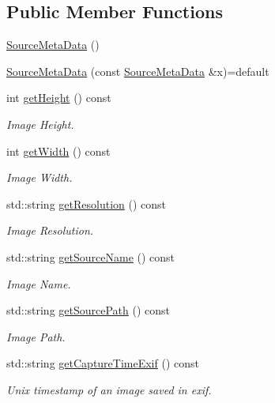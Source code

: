 \subsection*{Public Member Functions}
\begin{DoxyCompactItemize}
\item 
\hyperlink{classwtl_1_1_source_meta_data_a79f846523696923b9e7d62fab52fb96c}{Source\+Meta\+Data} ()
\item 
\hyperlink{classwtl_1_1_source_meta_data_acc7b69f117a62e3379c72584597d2d8d}{Source\+Meta\+Data} (const \hyperlink{classwtl_1_1_source_meta_data}{Source\+Meta\+Data} \&x)=default
\item 
int \hyperlink{classwtl_1_1_source_meta_data_a4053efeed2a7777d236640c94a411862}{get\+Height} () const
\begin{DoxyCompactList}\small\item\em Image Height. \end{DoxyCompactList}\item 
int \hyperlink{classwtl_1_1_source_meta_data_a42f1f73264921d73e5ba08a589630ea0}{get\+Width} () const
\begin{DoxyCompactList}\small\item\em Image Width. \end{DoxyCompactList}\item 
std\+::string \hyperlink{classwtl_1_1_source_meta_data_a2720b2135f4680d231365a3883053e13}{get\+Resolution} () const
\begin{DoxyCompactList}\small\item\em Image Resolution. \end{DoxyCompactList}\item 
std\+::string \hyperlink{classwtl_1_1_source_meta_data_a447b4425de148173e4e098a612c35b49}{get\+Source\+Name} () const
\begin{DoxyCompactList}\small\item\em Image Name. \end{DoxyCompactList}\item 
std\+::string \hyperlink{classwtl_1_1_source_meta_data_a97c4d177a47b1dc7e761e4eb652ff663}{get\+Source\+Path} () const
\begin{DoxyCompactList}\small\item\em Image Path. \end{DoxyCompactList}\item 
std\+::string \hyperlink{classwtl_1_1_source_meta_data_a08906d8f70a1de5931be41a0e25d8564}{get\+Capture\+Time\+Exif} () const
\begin{DoxyCompactList}\small\item\em Unix timestamp of an image saved in exif. \end{DoxyCompactList}\item 

\end{DoxyCompactItemize}
